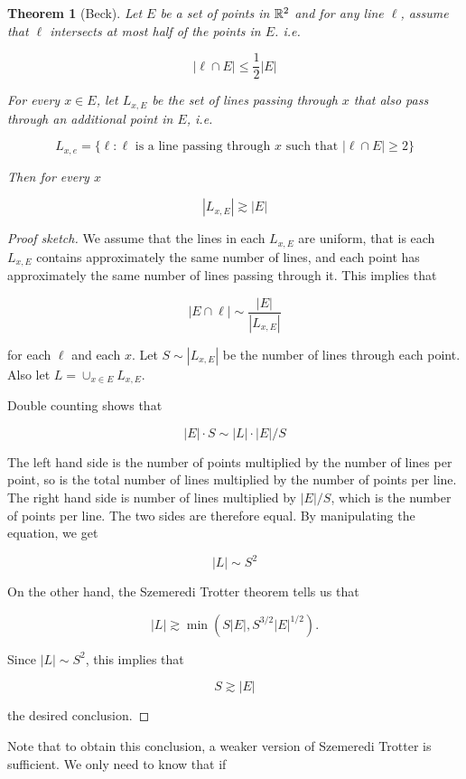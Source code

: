 \documentclass[12pt]{amsart}
\newtheorem{theorem}{Theorem}[section]
\begin{document}
\begin{theorem}[Beck]
    Let $E$ be a set of points in $\mathbb{R}^2$ and for any line $\ell$, assume that $\ell$ intersects at most half of the points in $E$. i.e. 

    $$ |\ell \cap E| \leq \frac{1}{2} |E|$$ 

    For every $x\in E$, let $L_{x,E}$ be the set of lines passing through $x$ that also pass through an additional point in $E$, i.e. 

    $$ L_{x,e} = \{\ell: \text{$\ell$ is a line passing through $x$ such that } |\ell \cap E | \geq 2\}$$ 

    Then for every $x$

    $$ |L_{x,E}| \gtrsim |E|$$ 
\end{theorem}
\begin{proof}[Proof sketch]
    We assume that the lines in each $L_{x,E} $ are uniform, that is each $L_{x,E}$ contains approximately the same number of lines, and each point has approximately the same number of lines passing through it.   This implies that

    $$ |E\cap \ell| \sim \frac{|E|}{|L_{x,E}|} $$ 

    for each $\ell$ and each $x$. Let $S \sim |L_{x,E}|$ be the number of lines through each point.   Also let $L = \cup_{x \in E} L_{x,E}$.
    
    
   Double counting shows that

    $$ |E| \cdot S \sim |L| \cdot |E|/S$$ 

    The left hand side is the number of points multiplied by the number of lines per point, so is the total number of lines multiplied by the number of points per line. The right hand side is number of lines multiplied by $|E|/S$, which is the number of points per line. The two sides are therefore equal.    By manipulating the equation,  we get

    $$ |L| \sim S^2$$ 

  On the other hand, the Szemeredi Trotter theorem tells us that  

    $$ |L| \gtrsim \min (S|E|, S^{3/2} |E|^{1/2}).$$ 

Since $|L| \sim S^2$,  this implies that 

    $$ S \gtrsim |E|$$ 

    the desired conclusion. 
\end{proof}

Note that to obtain this conclusion, a weaker version of Szemeredi Trotter is sufficient.   We only need to know that if 
\end{document}
